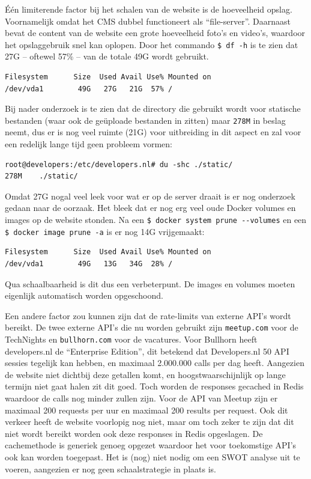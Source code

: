 Één limiterende factor bij het schalen van de website is de hoeveelheid opslag. Voornamelijk omdat het CMS dubbel functioneert als \enquote{file-server}. Daarnaast bevat de content van de website een grote hoeveelheid foto's en video's, waardoor het opslaggebruik snel kan oplopen. Door het commando \texttt{\$ df -h} is te zien dat 27G -- oftewel 57\% -- van de totale 49G wordt gebruikt.
\begin{verbatim}
Filesystem      Size  Used Avail Use% Mounted on
/dev/vda1        49G   27G   21G  57% /
\end{verbatim}
Bij nader onderzoek is te zien dat de directory die gebruikt wordt voor statische bestanden (waar ook de geüploade bestanden in zitten) maar \texttt{278M} in beslag neemt, dus er is nog veel ruimte (21G) voor uitbreiding in dit aspect en zal voor een redelijk lange tijd geen probleem vormen:
\begin{verbatim}
root@developers:/etc/developers.nl# du -shc ./static/
278M	./static/
\end{verbatim}

Omdat 27G nogal veel leek voor wat er op de server draait is er nog onderzoek gedaan naar de oorzaak. Het bleek dat er nog erg veel oude Docker volumes en images op de website stonden. Na een \texttt{\$ docker system prune -\--volumes} en een \texttt{\$ docker image prune -a} is er nog 14G vrijgemaakt:
\begin{verbatim}
Filesystem      Size  Used Avail Use% Mounted on
/dev/vda1        49G   13G   34G  28% /
\end{verbatim}
Qua schaalbaarheid is dit dus een verbeterpunt. De images en volumes moeten eigenlijk automatisch worden opgeschoond.

Een andere factor zou kunnen zijn dat de rate-limits van externe API's wordt bereikt. De twee externe API's die nu worden gebruikt zijn \texttt{meetup.com} voor de TechNights en \texttt{bullhorn.com} voor de vacatures. Voor Bullhorn heeft developers.nl de \enquote{Enterprise Edition}, dit betekend dat Developers.nl 50 API sessies tegelijk kan hebben, en maximaal 2.000.000 calls per dag heeft. Aangezien de website niet dichtbij deze getallen komt, en hoogstwaarschijnlijk op lange termijn niet gaat halen zit dit goed. Toch worden de responses gecached in Redis waardoor de calls nog minder zullen zijn. Voor de API van Meetup zijn er maximaal 200 requests per uur en maximaal 200 results per request. Ook dit verkeer heeft de website voorlopig nog niet, maar om toch zeker te zijn dat dit niet wordt bereikt worden ook deze responses in Redis opgeslagen. De cachemethode is generiek genoeg opgezet waardoor het voor toekomstige API's ook kan worden toegepast. Het is (nog) niet nodig om een SWOT analyse uit te voeren, aangezien er nog geen schaalstrategie in plaats is.

